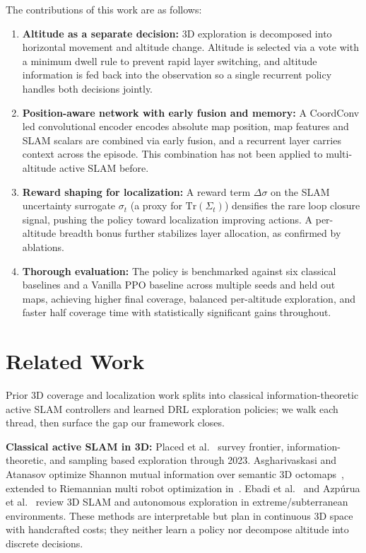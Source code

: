 \documentclass[runningheads]{llncs}
\begin{document}
The contributions of this work are as follows:
\begin{enumerate}
    \item \textbf{Altitude as a separate decision:} 3D exploration is decomposed into horizontal movement and altitude change. Altitude is selected via a vote with a minimum dwell rule to prevent rapid layer switching, and altitude information is fed back into the observation so a single recurrent policy handles both decisions jointly.
    \item \textbf{Position-aware network with early fusion and memory:} A CoordConv led convolutional encoder encodes absolute map position, map features and SLAM scalars are combined via early fusion, and a recurrent layer carries context across the episode. This combination has not been applied to multi-altitude active SLAM before.
    \item \textbf{Reward shaping for localization:} A reward term $\Delta\sigma$ on the SLAM uncertainty surrogate $\sigma_t$ (a proxy for $\mathrm{Tr}(\Sigma_t)$) densifies the rare loop closure signal, pushing the policy toward localization improving actions. A per-altitude breadth bonus further stabilizes layer allocation, as confirmed by ablations.
    \item \textbf{Thorough evaluation:} The policy is benchmarked against six classical baselines and a Vanilla PPO baseline across multiple seeds and held out maps, achieving higher final coverage, balanced per-altitude exploration, and faster half coverage time with statistically significant gains throughout.
\end{enumerate}

\section{Related Work}

Prior 3D coverage and localization work splits into classical information-theoretic active SLAM controllers and learned DRL exploration policies; we walk each thread, then surface the gap our framework closes.

\textbf{Classical active SLAM in 3D:} Placed et al.~\cite{placed2023survey} survey frontier, information-theoretic, and sampling based exploration through 2023. Asgharivaskasi and Atanasov optimize Shannon mutual information over semantic 3D octomaps~\cite{asgharivaskasi2023semantic}, extended to Riemannian multi robot optimization in~\cite{asgharivaskasi2025riemannian}. Ebadi et al.~\cite{ebadi2023extreme} and Azp\'urua et al.~\cite{azpurua2023subterranean} review 3D SLAM and autonomous exploration in extreme/subterranean environments. These methods are interpretable but plan in continuous 3D space with handcrafted costs; they neither learn a policy nor decompose altitude into discrete decisions.
\end{document}
